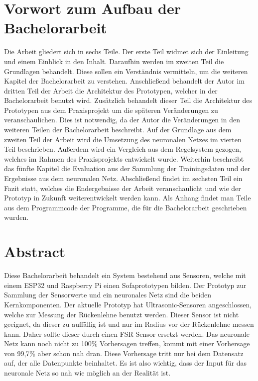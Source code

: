 \chapter*{Vorwort zum Aufbau der Bachelorarbeit}
Die Arbeit gliedert sich in sechs Teile. Der erste Teil widmet sich der Einleitung und einem Einblick in den Inhalt. Daraufhin werden im zweiten Teil die Grundlagen behandelt. Diese sollen ein Verständnis vermitteln, um die weiteren Kapitel der Bachelorarbeit zu verstehen. 
\newline
\newline
Anschließend behandelt der Autor im dritten Teil der Arbeit die Architektur des Prototypen, welcher in der Bachelorarbeit benutzt wird. Zusätzlich behandelt dieser Teil die Architektur des Prototypen aus dem Praxisprojekt um die späteren Veränderungen zu veranschaulichen. Dies ist notwendig, da der Autor die Veränderungen in den weiteren Teilen der Bachelorarbeit beschreibt.
\newline
Auf der Grundlage aus dem zweiten Teil der Arbeit wird die Umsetzung des neuronalen Netzes im vierten Teil beschrieben. Außerdem wird ein Vergleich aus dem Regelsystem gezogen, welches im Rahmen des Praxisprojekts entwickelt wurde.
\newline
Weiterhin beschreibt das fünfte Kapitel die Evaluation aus der Sammlung der Trainingsdaten und der Ergebnisse aus dem neuronalen Netz.
\newline
\newline
Abschließend findet im sechsten Teil ein Fazit statt, welches die Endergebnisse der Arbeit veranschaulicht und wie der Prototyp in Zukunft weiterentwickelt werden kann.
Als Anhang findet man Teile aus dem Programmcode der Programme, die für die Bachelorarbeit geschrieben wurden.
\newpage
\chapter*{Abstract}
Diese Bachelorarbeit behandelt ein System bestehend aus Sensoren, welche mit einem ESP32 und Raspberry Pi einen Sofaprototypen bilden. Der Prototyp zur Sammlung der Sensorwerte und ein neuronales Netz sind die beiden Kernkomponenten. Der aktuelle Prototyp hat Ultrasonic-Sensoren angeschlossen, welche zur Messung der Rückenlehne benutzt werden. Dieser Sensor ist nicht geeignet, da dieser zu auffällig ist und nur im Radius vor der Rückenlehne messen kann. Daher sollte dieser durch einen FSR-Sensor ersetzt werden. Das neuronale Netz kann noch nicht zu 100\% Vorhersagen treffen, kommt mit einer Vorhersage von 99,7\% aber schon nah dran. Diese Vorhersage tritt nur bei dem Datensatz auf, der alle Datenpunkte beinhaltet. Es ist also wichtig, dass der Input für das neuronale Netz so nah wie möglich an der Realität ist.
